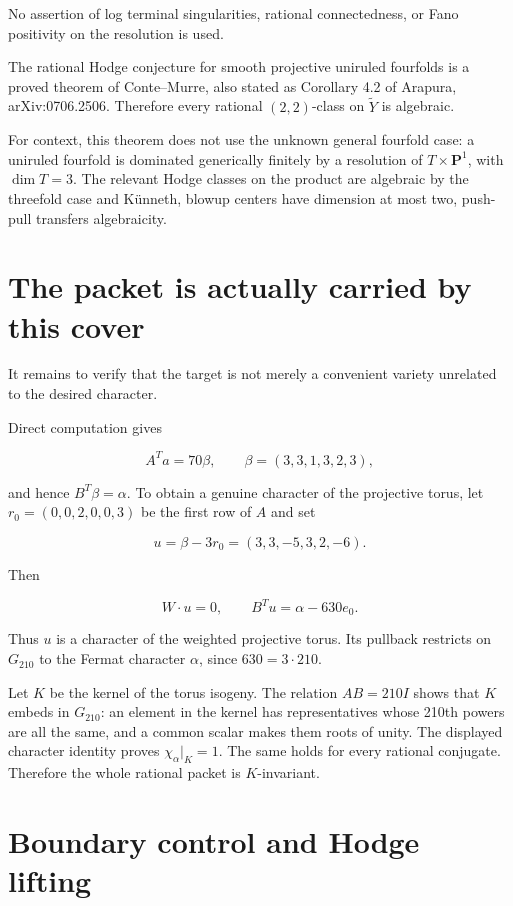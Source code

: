 No assertion of log terminal singularities, rational connectedness, or
Fano positivity on the resolution is used.

The rational Hodge conjecture for smooth projective uniruled fourfolds
is a proved theorem of Conte--Murre, also stated as Corollary 4.2 of
Arapura, arXiv:0706.2506. Therefore every rational \((2,2)\)-class on
\(\widetilde Y\) is algebraic.

For context, this theorem does not use the unknown general fourfold
case: a uniruled fourfold is dominated generically finitely by a
resolution of \(T\times\mathbf P^1\), with \(\dim T=3\). The relevant
Hodge classes on the product are algebraic by the threefold case and
Künneth, blowup centers have dimension at most two, push-pull transfers
algebraicity.

\hypertarget{carrier70-the-packet-is-actually-carried-by-this-cover}{%
\section{The packet is actually carried by this
cover}\label{carrier70-the-packet-is-actually-carried-by-this-cover}}

It remains to verify that the target is not merely a convenient variety
unrelated to the desired character.

Direct computation gives

\[
A^Ta=70\beta,\qquad \beta=(3,3,1,3,2,3),
\]

and hence \(B^T\beta=\alpha\). To obtain a genuine character of the
projective torus, let \(r_0=(0,0,2,0,0,3)\) be the first row of \(A\)
and set

\[
u=\beta-3r_0=(3,3,-5,3,2,-6).
\]

Then

\[
W\cdot u=0,\qquad B^Tu=\alpha-630e_0.
\]

Thus \(u\) is a character of the weighted projective torus. Its pullback
restricts on \(G_{210}\) to the Fermat character \(\alpha\), since
\(630=3\cdot210\).

Let \(K\) be the kernel of the torus isogeny. The relation \(AB=210I\)
shows that \(K\) embeds in \(G_{210}\): an element in the kernel has
representatives whose 210th powers are all the same, and a common scalar
makes them roots of unity. The displayed character identity proves
\(\chi_\alpha|_K=1\). The same holds for every rational conjugate.
Therefore the whole rational packet is \(K\)-invariant.

\hypertarget{carrier70-boundary-control-and-hodge-lifting}{%
\section{Boundary control and Hodge
lifting}\label{carrier70-boundary-control-and-hodge-lifting}}

